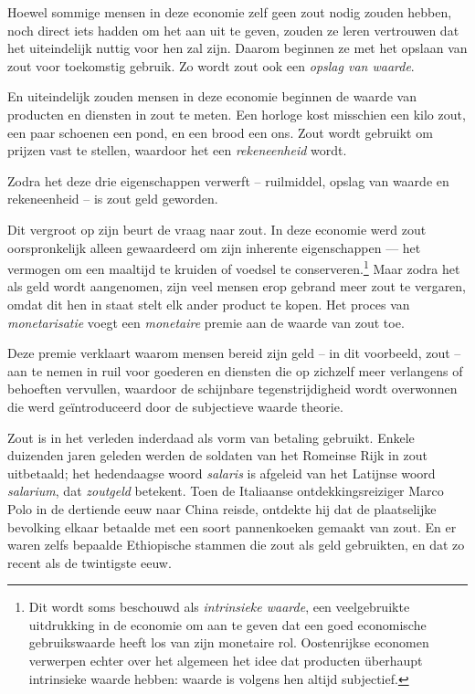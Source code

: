 \documentclass[
  a5paper,
  smalldemyvopaper,11pt,twoside,onecolumn,openright,extrafontsizes,
hidelinks]{memoir}
\begin{document}
Hoewel sommige mensen in deze economie zelf geen zout nodig zouden
hebben, noch direct iets hadden om het aan uit te geven, zouden ze leren
vertrouwen dat het uiteindelijk nuttig voor hen zal zijn. Daarom
beginnen ze met het opslaan van zout voor toekomstig gebruik. Zo wordt
zout ook een \emph{opslag van waarde}.

En uiteindelijk zouden mensen in deze economie beginnen de waarde van
producten en diensten in zout te meten. Een horloge kost misschien een
kilo zout, een paar schoenen een pond, en een brood een ons. Zout wordt
gebruikt om prijzen vast te stellen, waardoor het een
\emph{rekeneenheid} wordt.

Zodra het deze drie eigenschappen verwerft -- ruilmiddel, opslag van
waarde en rekeneenheid -- is zout geld geworden.

Dit vergroot op zijn beurt de vraag naar zout. In deze economie werd
zout oorspronkelijk alleen gewaardeerd om zijn inherente eigenschappen
--- het vermogen om een maaltijd te kruiden of voedsel te
conserveren.\footnote{Dit wordt soms beschouwd als \emph{intrinsieke
  waarde}, een veelgebruikte uitdrukking in de economie om aan te geven
  dat een goed economische gebruikswaarde heeft los van zijn monetaire
  rol. Oostenrijkse economen verwerpen echter over het algemeen het idee
  dat producten überhaupt intrinsieke waarde hebben: waarde is volgens
  hen altijd subjectief.} Maar zodra het als geld wordt aangenomen, zijn
veel mensen erop gebrand meer zout te vergaren, omdat dit hen in staat
stelt elk ander product te kopen. Het proces van \emph{monetarisatie}
voegt een \emph{monetaire} premie aan de waarde van zout toe.

Deze premie verklaart waarom mensen bereid zijn geld -- in dit
voorbeeld, zout -- aan te nemen in ruil voor goederen en diensten die op
zichzelf meer verlangens of behoeften vervullen, waardoor de schijnbare
tegenstrijdigheid wordt overwonnen die werd geïntroduceerd door de
subjectieve waarde theorie.

Zout is in het verleden inderdaad als vorm van betaling gebruikt. Enkele
duizenden jaren geleden werden de soldaten van het Romeinse Rijk in zout
uitbetaald; het hedendaagse woord \emph{salaris} is afgeleid van het
Latijnse woord \emph{salarium}, dat \emph{zoutgeld} betekent. Toen de
Italiaanse ontdekkingsreiziger Marco Polo in de dertiende eeuw naar
China reisde, ontdekte hij dat de plaatselijke bevolking elkaar betaalde
met een soort pannenkoeken gemaakt van zout. En er waren zelfs bepaalde
Ethiopische stammen die zout als geld gebruikten, en dat zo recent als
de twintigste eeuw.
\end{document}
